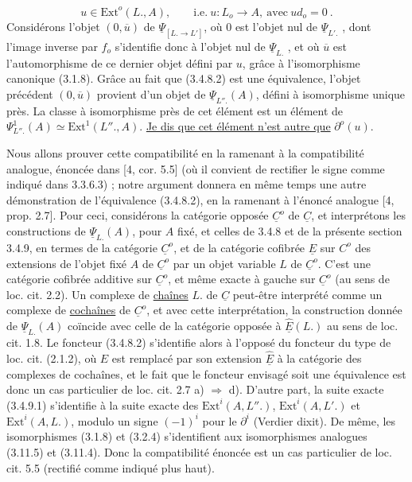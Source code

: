 \begin{equation*}
u \in \mathrm{Ext}^o(L.,A), \qquad \mathrm{i.e.} \ u : L_o \longrightarrow A, \ \mathrm{avec} \ ud_o = 0 \ .
\end{equation*}
Considérons l'objet $(0,\overline{u})$ de $\underline{\Psi}_{[L. \to L']}$, où $0$ est l'objet nul de $\underline{\Psi}_{L'.}$ , dont l'image inverse par $f_o$ s'identifie donc à l'objet nul de $\underline{\Psi}_{L.}$ , et où $\overline{u}$ est l'automorphisme de ce dernier objet défini par $u$, grâce à l'isomorphisme canonique (3.1.8). Grâce au fait que (3.4.8.2) est une équivalence, l'objet précédent $(0,\overline{u})$ provient d'un objet de $\underline{\Psi}_{L''.}(A)$, défini à isomorphisme unique près. La classe à isomorphisme près de cet élément est un élément de $\Psi^1_{L''.}(A) \simeq \mathrm{Ext}^1(L''.,A)$. \underline{Je dis que cet élément n'est autre que} $\partial^o(u)$.

Nous allons prouver cette compatibilité en la ramenant à la compatibilité analogue, énoncée dans [4, cor. 5.5] (où il convient de rectifier le signe comme indiqué dans 3.3.6.3) ; notre argument donnera en même temps une autre démonstration de l'équivalence (3.4.8.2), en la ramenant à l'énoncé analogue [4, prop. 2.7]. Pour ceci, considérons la catégorie opposée $\underline{C}^o$ de $\underline{C}$, et interprétons les constructions de $\underline{\Psi}_{L.}(A)$, pour $A$ fixé, et celles de 3.4.8 et de la présente section 3.4.9, en termes de la catégorie $\underline{C}^o$, et de la catégorie cofibrée $\underline{E}$ sur $C^o$ des extensions de l'objet fixé $A$ de $\underline{C}^o$ par un objet variable $L$ de $\underline{C}^o$. C'est une catégorie cofibrée additive sur $\underline{C}^o$, et même exacte à gauche sur $\underline{C}^o$ (au sens de loc. cit. 2.2). Un complexe de \underline{chaînes} $L.$ de $\underline{C}$ peut-être interprété  comme
un complexe de \underline{cochaînes} de $\underline{C}^o$, et avec cette interprétation, la construction donnée de $\underline{\Psi}_{L.}(A)$ coïncide avec celle de la catégorie opposée à $\underline{\hat{E}}(L.)$ au sens de loc. cit. 1.8. Le foncteur (3.4.8.2) s'identifie alors à l'opposé du foncteur du type de loc. cit. (2.1.2), où $E$ est remplacé par son extension $\underline{\hat{E}}$ à la catégorie des complexes de cochaînes, et le fait que le foncteur envisagé soit une équivalence est donc un cas particulier de loc. cit. 2.7 a) $\Longrightarrow$ d). D'autre part, la suite exacte (3.4.9.1) s'identifie à la suite exacte des $\mathrm{Ext}^i(A,L''.)$, $\mathrm{Ext}^i(A,L'.)$ et $\mathrm{Ext}^i(A,L.)$, modulo un signe $(-1)^i$ pour le $\partial^i$ (Verdier dixit). De même, les isomorphismes (3.1.8) et (3.2.4) s'identifient aux isomorphismes analogues (3.11.5) et (3.11.4). Donc la compatibilité énoncée est un cas particulier de loc. cit. 5.5 (rectifié comme indiqué plus haut).

